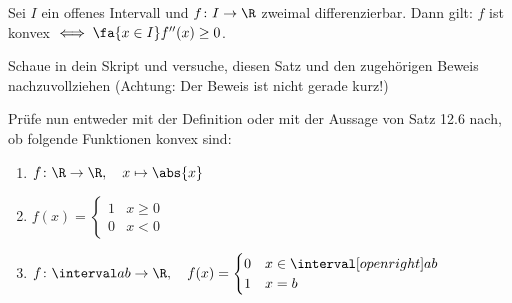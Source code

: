 \begin{exercise} %
  \begin{theorem}[Satz 12.6]
    Sei $I$ ein offenes Intervall und $f \colon I \to \R$ zweimal
    differenzierbar. Dann gilt: $f$ ist konvex
    $\iff \fa{x \in I} f''(x) \geq 0$.
  \end{theorem}
  Schaue in dein Skript und versuche, diesen Satz und den zugehörigen Beweis
  nachzuvollziehen (Achtung: Der Beweis ist nicht gerade kurz!)

  Prüfe nun entweder mit der Definition oder mit der Aussage von Satz 12.6 nach,
  ob folgende Funktionen konvex sind:
  \begin{enumerate}[label=(\alph*)]
  \item $f \colon \R \to \R, \quad x \mapsto \abs{x}$
  \item $f(x) =
    \begin{cases}
      1 & x \geq 0\\
      0 & x < 0
    \end{cases}$
  \item $f \colon \interval a b \to \R, \quad
    f(x) =
    \begin{cases}
      0 &x \in \interval[open right] a b\\
      1 & x = b
    \end{cases}$
  \end{enumerate}
\end{exercise}
